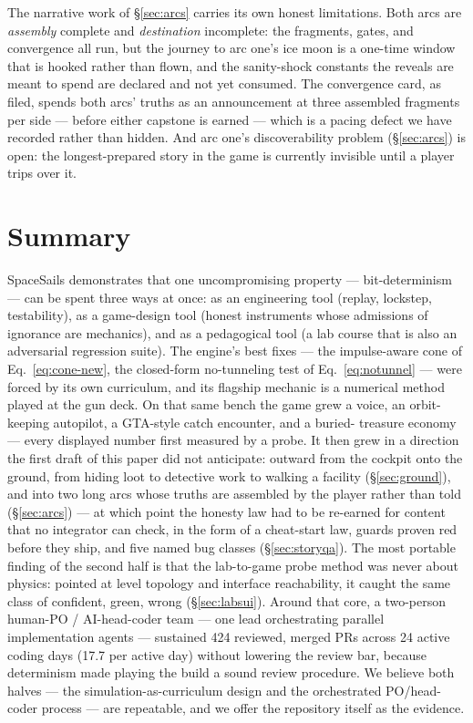 \documentclass[10pt,twocolumn]{article}
\begin{document}
The narrative work of \S\ref{sec:arcs} carries its own honest limitations. Both arcs are
\emph{assembly} complete and \emph{destination} incomplete: the fragments, gates, and
convergence all run, but the journey to arc one's ice moon is a one-time window that is
hooked rather than flown, and the sanity-shock constants the reveals are meant to spend are
declared and not yet consumed. The convergence card, as filed, spends both arcs' truths as an
announcement at three assembled fragments per side --- before either capstone is earned ---
which is a pacing defect we have recorded rather than hidden. And arc one's discoverability
problem (\S\ref{sec:arcs}) is open: the longest-prepared story in the game is currently
invisible until a player trips over it.

\section{Summary}

SpaceSails demonstrates that one uncompromising property --- bit-determinism --- can be
spent three ways at once: as an engineering tool (replay, lockstep, testability), as a
game-design tool (honest instruments whose admissions of ignorance are mechanics), and as
a pedagogical tool (a lab course that is also an adversarial regression suite). The
engine's best fixes --- the impulse-aware cone of Eq.~\eqref{eq:cone-new}, the closed-form
no-tunneling test of Eq.~\eqref{eq:notunnel} --- were forced by its own curriculum, and
its flagship mechanic is a numerical method played at the gun deck. On that same bench the
game grew a voice, an orbit-keeping autopilot, a GTA-style catch encounter, and a buried-%
treasure economy --- every displayed number first measured by a probe. It then grew in a
direction the first draft of this paper did not anticipate: outward from the cockpit onto the
ground, from hiding loot to detective work to walking a facility (\S\ref{sec:ground}), and
into two long arcs whose truths are assembled by the player rather than told
(\S\ref{sec:arcs}) --- at which point the honesty law had to be re-earned for content that no
integrator can check, in the form of a cheat-start law, guards proven red before they ship,
and five named bug classes (\S\ref{sec:storyqa}). The most portable finding of the second
half is that the lab-to-game probe method was never about physics: pointed at level topology
and interface reachability, it caught the same class of confident, green, wrong
(\S\ref{sec:labsui}). Around that core, a two-person human-PO / AI-head-coder team --- one
lead orchestrating parallel implementation agents --- sustained 424 reviewed, merged PRs
across 24 active coding days (17.7 per active day) without lowering the review bar, because
determinism made playing the build a sound review procedure. We believe both halves --- the
simulation-as-curriculum design and the orchestrated PO/head-coder process --- are
repeatable, and we offer the repository itself as the evidence.
\end{document}
